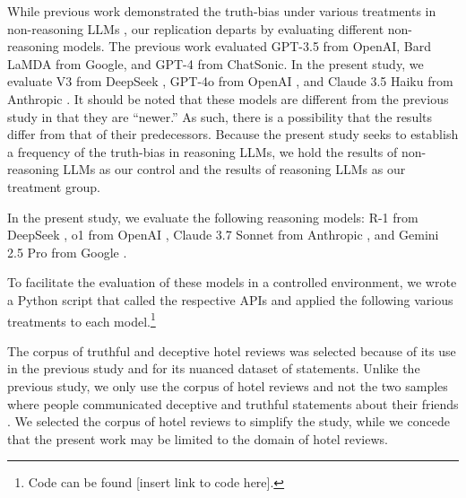 \documentclass{article}
\begin{document}
While previous work demonstrated the truth-bias under various treatments in non-reasoning LLMs \citep{markowitz_generative_2024}, our replication departs by evaluating different non-reasoning models. The previous work evaluated GPT-3.5 from OpenAI, Bard LaMDA from Google, and GPT-4 from ChatSonic. In the present study, we evaluate V3 from DeepSeek \citep{deepseekai2025deepseekv3technicalreport}, GPT-4o from OpenAI \citep{openai2024gpt4ocard}, and Claude 3.5 Haiku from Anthropic \citep{anthropic_claude_2024}. It should be noted that these models are different from the previous study in that they are ``newer.'' As such, there is a possibility that the results differ from that of their predecessors. Because the present study seeks to establish a frequency of the truth-bias in reasoning LLMs, we hold the results of non-reasoning LLMs as our control and the results of reasoning LLMs as our treatment group.


In the present study, we evaluate the following reasoning models: R-1 from DeepSeek \citep{deepseek-ai_deepseek-r1_2025}, o1 from OpenAI \citep{openai_openai_2024}, Claude 3.7 Sonnet from Anthropic \citep{anthropic_claude_2025}, and Gemini 2.5 Pro from Google \citep{deepmindGemini}.

To facilitate the evaluation of these models in a controlled environment, we wrote a Python script that called the respective APIs and applied the following various treatments to each model.\footnote{Code can be found [insert link to code here].} %

The corpus of truthful and deceptive hotel reviews \citep{ott_finding_2011} was selected because of its use in the previous study \citep{markowitz_generative_2024} and for its nuanced dataset of statements. Unlike the previous study, we only use the corpus of hotel reviews \citep{ott_finding_2011} and not the two samples where people communicated deceptive and truthful statements about their friends \citep{markowitz_when_2020, lloyd_miami_2019}. We selected the corpus of hotel reviews to simplify the study, while we concede that the present work may be limited to the domain of hotel reviews.
\end{document}
